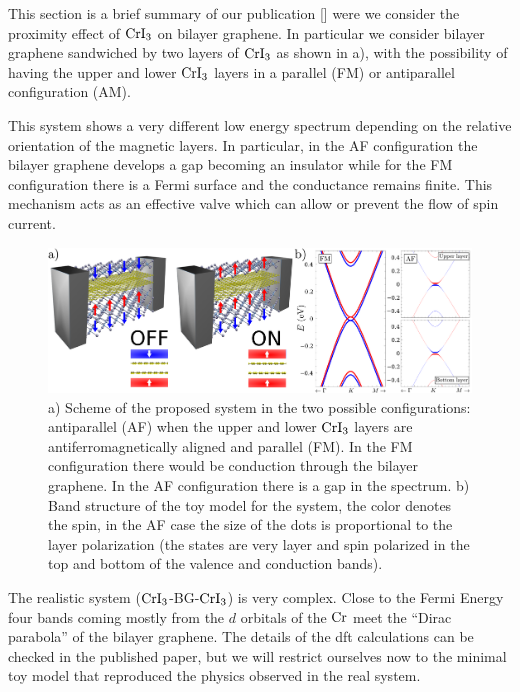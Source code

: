This section is a brief summary of our publication [] were we consider the proximity effect of $\ce{CrI_3}$ on bilayer graphene. In particular we consider bilayer graphene sandwiched by two layers of $\ce{CrI_3}$ as shown in a), with the possibility of having the upper and lower $\ce{CrI_3}$ layers in a parallel (FM) or antiparallel configuration (AM).

This system shows a very different low energy  spectrum depending on the relative orientation of the magnetic layers. In particular, in the AF configuration the bilayer graphene develops a gap becoming an insulator while for the FM configuration there is a Fermi surface and the conductance remains finite. This mechanism acts as an effective valve which can allow or prevent the flow of spin current.

\begin{figure}[h!]
\centering
\includegraphics{graphene_bilayer/figures/cri3_valve.pdf}
\vspace{-5pt}
\caption{a) Scheme of the proposed system in the two possible configurations: antiparallel (AF) when the upper and lower $\ce{CrI_3}$ layers are antiferromagnetically aligned and parallel (FM). In the FM configuration there would be conduction through the bilayer graphene. In the AF configuration there is a gap in the spectrum. b) Band structure of the toy model for the system, the color denotes the spin, in the AF case the size of the dots is proportional to the layer polarization (the states are very layer and spin polarized in the top and bottom of the valence and conduction bands).}
\label{cri3}
\end{figure}

The realistic system ($\ce{CrI_3}$-BG-$\ce{CrI_3}$) is very complex. Close to the Fermi Energy four bands coming mostly from the $d$ orbitals of the $\ce{Cr}$ meet the ``Dirac parabola'' of the bilayer graphene. The details of the \ac{dft} calculations can be checked in the published paper\cite{Cardoso2018}, but we will restrict ourselves now to the minimal toy model that reproduced the physics observed in the real system.


